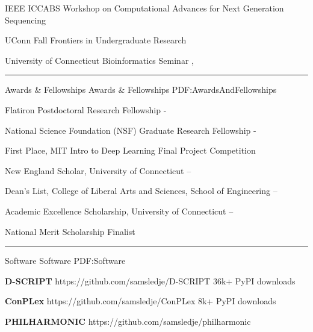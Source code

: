 \documentclass[letterpaper,MMMyyyy,nonstopmode]{simpleresumecv}
\begin{document}
\begin{Body}
\Entry
{IEEE ICCABS Workshop on Computational Advances for Next Generation Sequencing}
\hfill
{}
\Gap

\Entry
{UConn Fall Frontiers in Undergraduate Research}
\hfill
{}
\Gap

\Entry
{University of Connecticut Bioinformatics Seminar}
\hfill
{}, 

\BigGap
\hrule
\Section
{Awards \&\newline
Fellowships}
{Awards \& Fellowships}
{PDF:AwardsAndFellowships}

\Item Flatiron Postdoctoral Research Fellowship
\hfill
{} - 
\Gap

\Item National Science Foundation (NSF) Graduate Research Fellowship
\hfill
{} - 
\Gap

\Item First Place, MIT Intro to Deep Learning Final Project Competition
\hfill
{}
\Gap

\Item New England Scholar, University of Connecticut
\hfill
{} -- 
\Gap

\Item Dean's List, College of Liberal Arts and Sciences, School of Engineering
\hfill
{} --
\Gap

\Item Academic Excellence Scholarship, University of Connecticut
\hfill
{} -- 
\Gap




\Item National Merit Scholarship Finalist
\hfill
{}

\BigGap
\hrule
\Section
{Software}
{Software}
{PDF:Software}

\Entry
{\textbf{D-SCRIPT}}
\hfill https://github.com/samsledje/D-SCRIPT
\Gap
\Item
36k+ PyPI downloads
\BigGap

\Entry
{\textbf{ConPLex}}
\hfill https://github.com/samsledje/ConPLex
\Gap
\Item
8k+ PyPI downloads
\BigGap

\Entry
{\textbf{PHILHARMONIC}}
\hfill https://github.com/samsledje/philharmonic
\BigGap


\end{Body}
\end{document}
